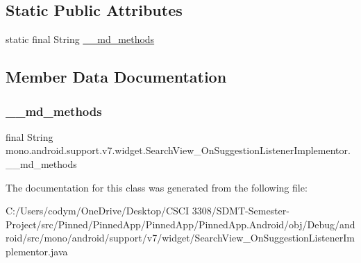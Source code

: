 \subsection*{Static Public Attributes}
\begin{DoxyCompactItemize}
\item 
static final String \hyperlink{classmono_1_1android_1_1support_1_1v7_1_1widget_1_1_search_view___on_suggestion_listener_implementor_a44a48ff09acbe6b4fd082f476212f5c7}{\+\_\+\+\_\+md\+\_\+methods}
\end{DoxyCompactItemize}


\subsection{Member Data Documentation}
\mbox{\label{classmono_1_1android_1_1support_1_1v7_1_1widget_1_1_search_view___on_suggestion_listener_implementor_a44a48ff09acbe6b4fd082f476212f5c7}} 
\subsubsection{\texorpdfstring{\+\_\+\+\_\+md\+\_\+methods}{\_\_md\_methods}}
{\footnotesize\ttfamily final String mono.\+android.\+support.\+v7.\+widget.\+Search\+View\+\_\+\+On\+Suggestion\+Listener\+Implementor.\+\_\+\+\_\+md\+\_\+methods\hspace{0.3cm}{\ttfamily [static]}}



The documentation for this class was generated from the following file\+:\begin{DoxyCompactItemize}
\item 
C\+:/\+Users/codym/\+One\+Drive/\+Desktop/\+C\+S\+C\+I 3308/\+S\+D\+M\+T-\/\+Semester-\/\+Project/src/\+Pinned/\+Pinned\+App/\+Pinned\+App/\+Pinned\+App.\+Android/obj/\+Debug/android/src/mono/android/support/v7/widget/Search\+View\+\_\+\+On\+Suggestion\+Listener\+Implementor.\+java\end{DoxyCompactItemize}
